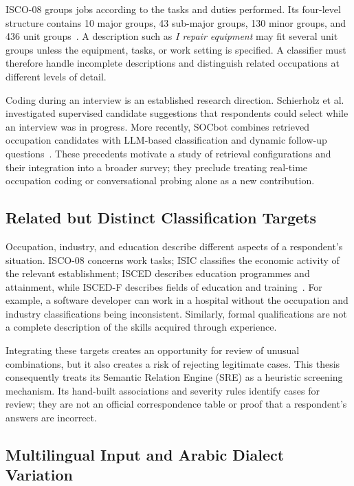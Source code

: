 ISCO-08 groups jobs according to the tasks and duties performed. Its
four-level structure contains 10 major groups, 43 sub-major groups,
130 minor groups, and 436 unit groups~\cite{ilo2012isco_v1}.
A description such as \emph{I repair equipment} may fit several unit groups
unless the equipment, tasks, or work setting is specified. A classifier
must therefore handle incomplete descriptions and distinguish related
occupations at different levels of detail.

Coding during an interview is an established research direction.
Schierholz et al.~\cite{schierholz2016interview} investigated supervised
candidate suggestions that respondents could select while an interview
was in progress. More recently, SOCbot combines retrieved occupation
candidates with LLM-based classification and dynamic follow-up
questions~\cite{kochar2025socbot}. These precedents motivate a study of
retrieval configurations and their integration into a broader survey;
they preclude treating real-time occupation coding or conversational
probing alone as a new contribution.

\subsection{Related but Distinct Classification Targets}

Occupation, industry, and education describe different aspects of a
respondent's situation. ISCO-08 concerns work tasks; ISIC classifies the
economic activity of the relevant establishment; ISCED describes education
programmes and attainment, while ISCED-F describes fields of education
and training~\cite{ilo2012isco_v1,unsd2008isic,unesco2012isced,unesco2015iscedf}.
For example, a software developer can work in a hospital without the
occupation and industry classifications being inconsistent. Similarly,
formal qualifications are not a complete description of the skills
acquired through experience.

Integrating these targets creates an opportunity for review of unusual
combinations, but it also creates a risk of rejecting legitimate cases.
This thesis consequently treats its Semantic Relation Engine (SRE) as a
heuristic screening mechanism. Its hand-built associations and severity
rules identify cases for review; they are not an official correspondence
table or proof that a respondent's answers are incorrect.

\subsection{Multilingual Input and Arabic Dialect Variation}

